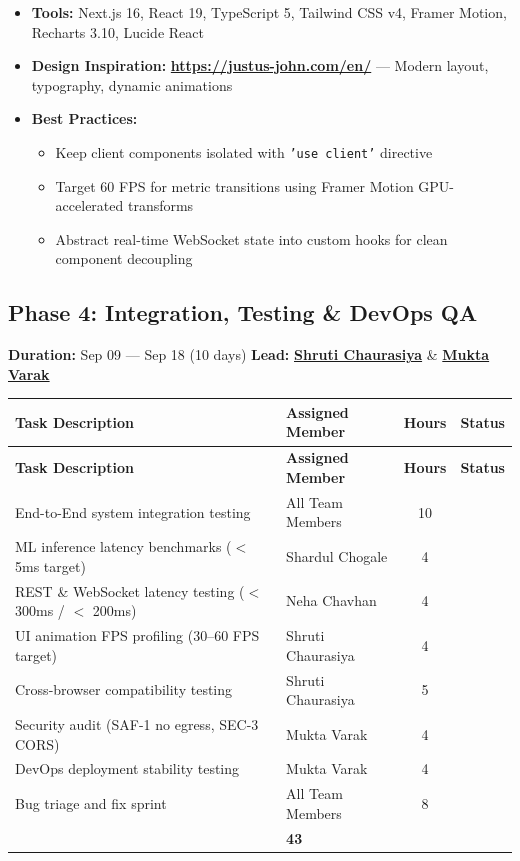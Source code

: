 \documentclass[11pt, a4paper]{article}
\newcommand{\xmark}{\textcolor{danger}{\ding{55}}}
\newcommand{\goref}[2]{\hyperref[#1]{\textcolor{primary}{\textbf{#2}}}}
\begin{document}
\begin{toolbox}
\small
\begin{itemize}[nosep]
    \item \textbf{Tools:} Next.js 16, React 19, TypeScript 5, Tailwind CSS v4, Framer Motion, Recharts 3.10, Lucide React
    \item \textbf{Design Inspiration:} \textbf{\url{https://justus-john.com/en/}} — Modern layout, typography, dynamic animations
    \item \textbf{Best Practices:}
    \begin{itemize}[nosep]
        \item Keep client components isolated with \texttt{'use client'} directive
        \item Target 60 FPS for metric transitions using Framer Motion GPU-accelerated transforms
        \item Abstract real-time WebSocket state into custom hooks for clean component decoupling
    \end{itemize}
\end{itemize}
\end{toolbox}

\subsection{Phase 4: Integration, Testing \& DevOps QA}
\label{sec:phase4}
\textbf{Duration:} Sep 09 — Sep 18 (10 days) \hfill \textbf{Lead:} \goref{sec:team}{Shruti Chaurasiya} \& \goref{sec:team}{Mukta Varak}

\noindent
\small
\begin{longtable}{|p{}|p{}|c|c|}
\hline
\rowcolor{primary!10}
\textbf{Task Description} & \textbf{Assigned Member} & \textbf{Hours} & \textbf{Status} \\
\hline
\endfirsthead
\hline
\rowcolor{primary!10}
\textbf{Task Description} & \textbf{Assigned Member} & \textbf{Hours} & \textbf{Status} \\
\hline
\endhead
End-to-End system integration testing & All Team Members & 10 & \xmark \\
ML inference latency benchmarks ($<$ 5ms target) & Shardul Chogale & 4 & \xmark \\
REST \& WebSocket latency testing ($<$ 300ms / $<$ 200ms) & Neha Chavhan & 4 & \xmark \\
UI animation FPS profiling (30--60 FPS target) & Shruti Chaurasiya & 4 & \xmark \\
Cross-browser compatibility testing & Shruti Chaurasiya & 5 & \xmark \\
Security audit (SAF-1 no egress, SEC-3 CORS) & Mukta Varak & 4 & \xmark \\
DevOps deployment stability testing & Mukta Varak & 4 & \xmark \\
Bug triage and fix sprint & All Team Members & 8 & \xmark \\
\hline
\rowcolor{lightgray}
\multicolumn{2}{|r|}{\textbf{Phase 4 Total}} & \textbf{43} & \\
\hline
\end{longtable}
\normalsize
\end{document}
